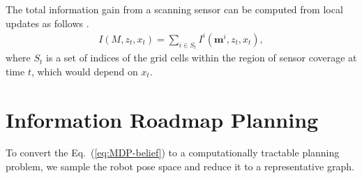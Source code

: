 \documentclass{article}
\newcommand{\note}[1]{{\color{cyan} NOTE: #1 }}
\begin{document}
The total information gain from a scanning sensor can be computed from local updates as follows
\cite{bourgault2002information}.
\begin{align}
  I(M, z_t, x_t) = \sum_{i \in S_t} I^i(\mathbf{m}^i, z_t, x_t),
  \label{eq:infogain}
\end{align}
where $S_t$ is a set of indices of the grid cells within the region of sensor coverage at time $t$, which would depend on $x_t$.




\section{Information Roadmap Planning}\label{sec:planning}
To convert the Eq.~(\ref{eq:MDP-belief}) to a computationally tractable planning problem, we sample the robot pose space and reduce it to a representative graph. 

\end{document}
